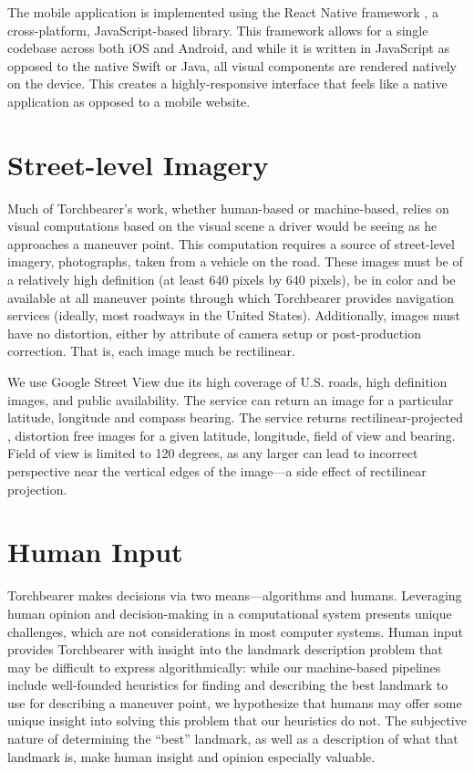 The mobile application is implemented using the React Native framework \cite{reactNative}, a cross-platform, JavaScript-based library. This framework allows for a single codebase across both iOS and  Android, and while it is written in JavaScript as opposed to the native Swift or Java, all visual components are rendered natively on the device. This creates a highly-responsive interface that feels like a native application as opposed to a mobile website. 

\section{Street-level Imagery}
Much of Torchbearer's work, whether human-based or machine-based, relies on visual computations based on the visual scene a driver would be seeing as he approaches a maneuver point. This computation requires a source of street-level imagery, photographs, taken from a vehicle on the road. These images must be of a relatively high definition (at least 640 pixels by 640 pixels), be in color and be available at all maneuver points through which Torchbearer provides navigation services (ideally, most roadways in the United States). Additionally, images must have no distortion, either by attribute of camera setup or post-production correction. That is, each image much be rectilinear.

We use Google Street View due its high coverage of U.S. roads, high definition images, and public availability. The service can return an image for a particular latitude, longitude and compass bearing. The service returns rectilinear-projected \cite{agarwal2015metric}, distortion free images for a given latitude, longitude, field of view and bearing. Field of view is limited to 120 degrees, as any larger can lead to incorrect perspective near the vertical edges of the image---a side effect of rectilinear projection.
 
\section{Human Input}
Torchbearer makes decisions via two means---algorithms and humans. Leveraging human opinion and decision-making in a computational system presents unique challenges, which are not considerations in most computer systems. Human input provides Torchbearer with insight into the landmark description problem that may be difficult to express algorithmically: while our machine-based pipelines include well-founded heuristics for finding and describing the best landmark to use for describing a maneuver point, we hypothesize that humans may offer some unique insight into solving this problem that our heuristics do not. The subjective nature of determining the “best” landmark, as well as a description of what that landmark is, make human insight and opinion especially valuable. 

